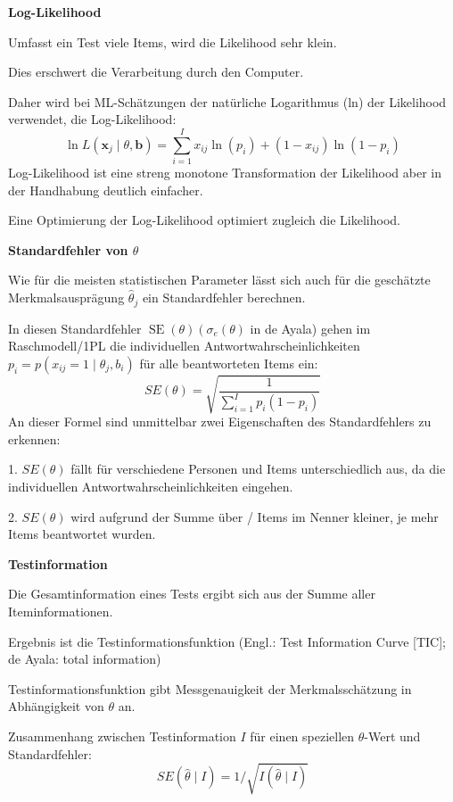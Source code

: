 \documentclass[10pt, letterpaper]{article}
\begin{document}
\vspace{0.4cm}
\textbf{Log-Likelihood}

Umfasst ein Test viele Items, wird die Likelihood sehr klein.

Dies erschwert die Verarbeitung durch den Computer.

Daher wird bei ML-Schätzungen der natürliche Logarithmus (ln) der Likelihood verwendet, die Log-Likelihood:
$$
\ln L\left(\boldsymbol{x}_j \mid \theta, \boldsymbol{b}\right)=\sum_{i=1}^I x_{i j} \ln \left(p_i\right)+\left(1-x_{i j}\right) \ln \left(1-p_i\right)
$$
Log-Likelihood ist eine streng monotone Transformation der Likelihood aber in der Handhabung deutlich einfacher.

Eine Optimierung der Log-Likelihood optimiert zugleich die Likelihood.

\vspace{0.4cm}
\textbf{Standardfehler von $\theta$}

Wie für die meisten statistischen Parameter lässt sich auch für die geschätzte Merkmalsausprägung $\hat{\theta}_j$ ein Standardfehler berechnen.

In diesen Standardfehler $\operatorname{SE}(\theta)\left(\sigma_e(\theta)\right.$ in de Ayala) gehen im Raschmodell/1PL die individuellen Antwortwahrscheinlichkeiten $p_i=p\left(x_{i j}=1 \mid \theta_j, b_i\right)$ für alle beantworteten Items ein:
$$
S E(\theta)=\sqrt{\frac{1}{\sum_{i=1}^I p_i\left(1-p_i\right)}}
$$
An dieser Formel sind unmittelbar zwei Eigenschaften des Standardfehlers zu erkennen:

1. $S E(\theta)$ fällt für verschiedene Personen und Items unterschiedlich aus, da die individuellen Antwortwahrscheinlichkeiten eingehen.

2. $S E(\theta)$ wird aufgrund der Summe über / Items im Nenner kleiner, je mehr Items beantwortet wurden.

\vspace{0.4cm}

\textbf{Testinformation}

Die Gesamtinformation eines Tests ergibt sich aus der Summe aller Iteminformationen.

Ergebnis ist die Testinformationsfunktion (Engl.: Test Information Curve [TIC]; de Ayala: total information)

Testinformationsfunktion gibt Messgenauigkeit der Merkmalsschätzung in Abhängigkeit von $\theta$ an.

Zusammenhang zwischen Testinformation $I$ für einen speziellen $\theta$-Wert und Standardfehler:
$$
S E(\hat{\theta} \mid I)=1 / \sqrt{I(\hat{\theta} \mid I)}
$$
\end{document}
